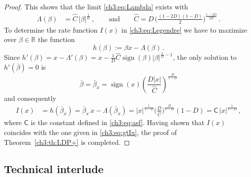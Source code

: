 \documentclass[a4paper,reqno,11pt]{amsart}
\numberwithin{equation}{section}
\newcommand{\R}{\mathbb{R}}
\DeclareMathOperator{\sign}{sign}
\newcommand\sfC{\mathsf{C}}
\begin{document}
\begin{proof}
This shows that the limit \eqref{ch3:eq:Lambda} exists with
\begin{align*}
 \Lambda(\beta)&=\hat C\, |\beta|^{\frac{1}{D}} \,, \qquad \text{and} \qquad
 \hat C = D \, \bigg(\frac{
	(1-2D) (1-D)}{2}\bigg)^{\frac{1-2D}{2D}} \,.
\end{align*}
To determine the rate function $I(x)$ in \eqref{ch3:eq:Legendre} we have 
to maximize over $\beta \in \R$ the function
\begin{equation*}
	h(\beta):=\beta x- \Lambda (\beta) \,.
\end{equation*}
Since $h'(\beta)=x-\Lambda'(\beta)=
x-\frac{1}{D}\hat C \sign(\beta)|\beta|^{\frac{1}{D}-1}$,
the only solution to $h'(\bar \beta)=0$ is
\[
 \bar \beta = \bar \beta_x= \sign (x)\left(\frac{D|x|}{\hat C}\right)^{\frac{D}{1-D}}
\]
and consequently 
\[
\begin{split}
	 I(x) & = h(\bar \beta_x)= \bar \beta_x\, x-\Lambda
	 ( \bar \beta_x) = 
	 |x|^{\frac{1}{1-D}} \bigg(\frac{D}{\hat C} \bigg)^{\frac{D}{1-D}}
	 (1- D ) = \sfC \, |x|^{\frac{1}{1-D}} \,,
\end{split}
\]
where $\sfC$ is the constant defined in \eqref{ch3:eq:asf}.
Having shown that $I(x)$ coincides
with the one given in \eqref{ch3:eq:gtIx}, the proof of 
Theorem~\ref{ch3:th:LDP+} is completed.
\end{proof}

\subsection{Technical interlude}
\end{document}
